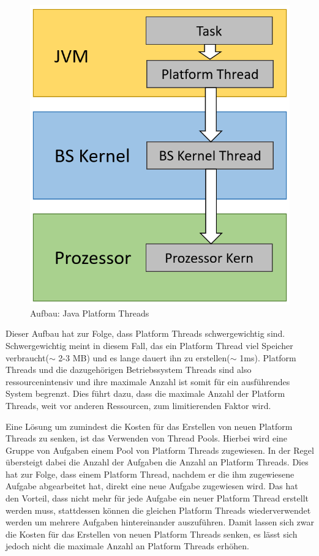 \documentclass[fontsize=12pt,paper=a4,twoside=semi,parskip=half-,headsepline,headinclude]{scrreprt}
\begin{document}
\begin{figure}[h]
	\centering
	\includegraphics[scale=0.5]{figures/PlatformThreads.png}
	\caption{Aufbau: Java Platform Threads}
	\label{fig:PlatformThreads}
\end{figure}

Dieser Aufbau hat zur Folge, dass Platform Threads schwergewichtig sind. Schwergewichtig meint in diesem Fall, das ein Platform Thread viel Speicher verbraucht($\sim$ 2-3 MB) und es lange dauert ihn zu erstellen($\sim$ 1ms). Platform Threads und die dazugehörigen Betriebssystem Threads sind also ressourcenintensiv und ihre maximale Anzahl ist somit für ein ausführendes System begrenzt. Dies führt dazu, dass die maximale Anzahl der Platform Threads, weit vor anderen Ressourcen, zum limitierenden Faktor wird. 

Eine Lösung um zumindest die Kosten für das Erstellen von neuen Platform Threads zu senken, ist das Verwenden von Thread Pools. Hierbei wird eine Gruppe von Aufgaben einem Pool von Platform Threads zugewiesen. In der Regel übersteigt dabei die Anzahl der Aufgaben die Anzahl an Platform Threads. Dies hat zur Folge, dass einem Platform Thread, nachdem er die ihm zugewiesene Aufgabe abgearbeitet hat, direkt eine neue Aufgabe zugewiesen wird. Das hat den Vorteil, dass nicht mehr für jede Aufgabe ein neuer Platform Thread erstellt werden muss, stattdessen können die gleichen Platform Threads wiederverwendet werden um mehrere Aufgaben hintereinander auszuführen. Damit lassen sich zwar die Kosten für das Erstellen von neuen Platform Threads senken, es lässt sich jedoch nicht die maximale Anzahl an Platform Threads erhöhen.
\end{document}
